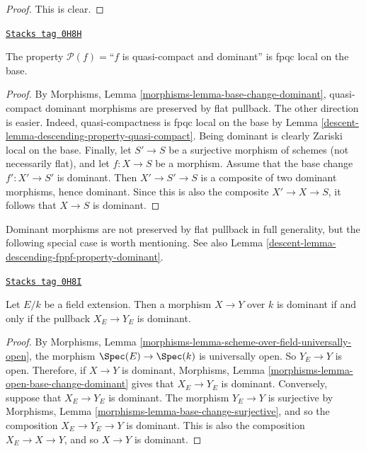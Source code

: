 \begin{proof}
This is clear.
\end{proof}

\begin{lemma}
\label{descent-lemma-descending-property-dominant}
\href{https://stacks.math.columbia.edu/tag/0H8H}{\texttt{Stacks tag 0H8H}}

The property $\mathcal{P}(f) =$``$f$ is quasi-compact and dominant''
is fpqc local on the base.
\end{lemma}

\begin{proof}

By Morphisms, Lemma \ref{morphisms-lemma-base-change-dominant},
quasi-compact dominant morphisms are preserved
by flat pullback. The other direction is easier.
Indeed, quasi-compactness is fpqc local on the base
by Lemma \ref{descent-lemma-descending-property-quasi-compact}.
Being dominant is clearly Zariski local on the base.
Finally, let $S' \to S$ be a surjective morphism of schemes
(not necessarily flat),
and let $f : X \to S$ be a morphism. Assume that the base change
$f' : X' \to S'$ is dominant. Then $X' \to S'\to S$ is a composite
of two dominant morphisms, hence dominant. Since this is also
the composite $X' \to X \to S$, it follows that $X\to S$ is dominant.
\end{proof}

Dominant morphisms are not preserved by flat pullback in full generality,
but the following special case is worth mentioning.
See also Lemma \ref{descent-lemma-descending-fppf-property-dominant}.

\begin{lemma}
\label{descent-lemma-descending-property-dominant-over-field}
\href{https://stacks.math.columbia.edu/tag/0H8I}{\texttt{Stacks tag 0H8I}}

Let $E/k$ be a field extension. Then a morphism
$X \to Y$ over $k$ is dominant if and only if
the pullback $X_E \to Y_E$ is dominant.
\end{lemma}

\begin{proof}
By Morphisms,
Lemma \ref{morphisms-lemma-scheme-over-field-universally-open},
the morphism $\Spec(E) \to \Spec(k)$
is universally open. So $Y_E \to Y$ is open.
Therefore, if $X \to Y$ is dominant, Morphisms,
Lemma \ref{morphisms-lemma-open-base-change-dominant} gives that
$X_E \to Y_E$ is dominant.
Conversely, suppose that $X_E \to Y_E$ is dominant.
The morphism $Y_E \to Y$ is surjective by Morphisms,
Lemma \ref{morphisms-lemma-base-change-surjective}, and so the composition
$X_E \to Y_E \to Y$ is dominant. This is also the composition
$X_E \to X \to Y$, and so $X \to Y$ is dominant.
\end{proof}

